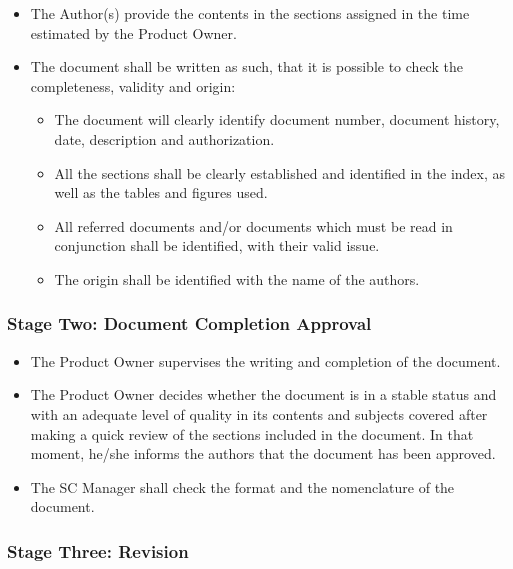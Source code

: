 \documentclass{template/openetcs_article}
\begin{document}
\begin{itemize}
\item The Author(s) provide the contents in the sections assigned in the time estimated by the Product Owner.
\item The document shall be written as such, that it is possible to check the completeness, validity and origin:
\begin{itemize}
\item The document will clearly identify document number, document history, date, description and authorization.
\item All the sections shall be clearly established and identified in the index, as well as the tables and figures used.
\item All referred documents and/or documents which must be read in conjunction shall be identified, with their valid issue.
\item The origin shall be identified with the name of the authors.
\end{itemize}
\end{itemize}

\subsubsection{Stage Two: Document Completion Approval}

\begin{itemize}
\item The Product Owner supervises the writing and completion of the document.
\item The Product Owner decides whether the document is in a stable status and with an adequate level of quality in its contents and subjects covered after making a quick review of the sections included in the document. In that moment, he/she informs the authors that the document has been approved.
\item The SC Manager shall check the format and the nomenclature of the document. 
\end{itemize}

\subsubsection{Stage Three: Revision}
\end{document}
